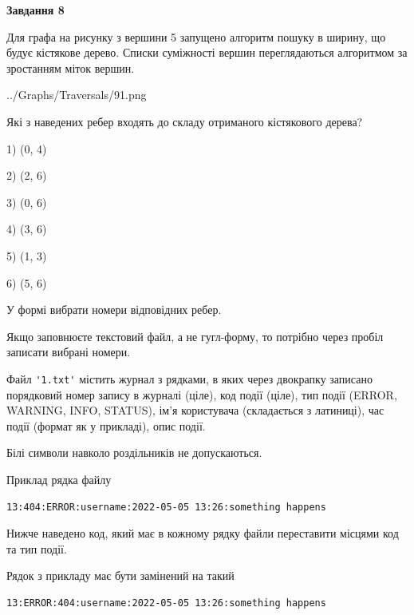 \documentclass[12pt, ukrainian]{article}
\def\code#1{\Verb!#1!}
\begin{document}
{\begin {large}
{\begin {center}\textbf{Завдання 8}\end {center}}\par
Для графа на рисунку з вершини 5 запущено алгоритм пошуку в ширину, що будує кістякове дерево. Списки суміжності вершин переглядаються алгоритмом за зростанням міток вершин.\par
\begin{center}
	{../Graphs/Traversals/91.png}
\end{center}
\par Які з наведених ребер входять до складу отриманого кістякового дерева?\par
1) (0, 4)\par
2) (2, 6)\par
3) (0, 6)\par
4) (3, 6)\par
5) (1, 3)\par
6) (5, 6)\par
{\vskip 15pt} У формі вибрати номери відповідних ребер.


Якщо заповнюєте текстовий файл, а не гугл-форму, то потрібно через пробіл записа\-ти вибрані номери.\par
\newpage


Файл \code{'1.txt'} містить журнал з рядками, в яких через двокрапку записано поряд\-ко\-вий номер запису в журналі (ціле), код події (ціле), тип події (ERROR,\\ WARNING, INFO, STATUS), ім'я користувача (складається з латиниці), час події (фор\-мат як у прикладі), опис події.

Білі символи навколо роздільників не допускаються.

Приклад рядка файлу



\begin{verbatim}
13:404:ERROR:username:2022-05-05 13:26:something happens
\end{verbatim}


Нижче наведено код, який має в кожному рядку файли переставити місцями код та тип події.

Рядок з прикладу має бути замінений на такий



\begin{verbatim}
13:ERROR:404:username:2022-05-05 13:26:something happens
\end{verbatim}





\end{large}}
\end{document}
